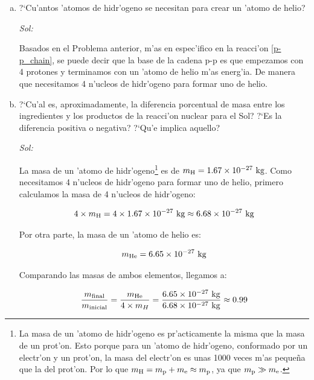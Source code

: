 \documentclass{article}
\begin{document}
\begin{enumerate} [a)]
\item ?`Cu'antos 'atomos de hidr'ogeno se necesitan para crear un 'atomo de helio?

\vspace{2mm}
\emph{Sol:}
\vspace{2mm}

Basados en el Problema anterior, m'as en espec'ifico en la reacci'on \eqref{p-p_chain}, se puede decir que la base de la cadena p-p es que empezamos con 4 protones y terminamos con un 'atomo de helio m'as energ'ia. De manera que necesitamos 4 n'ucleos de hidr'ogeno para formar uno de helio.

\item ?`Cu'al es, aproximadamente, la diferencia porcentual de masa entre los ingredientes y los productos de la reacci'on nuclear para el Sol? ?`Es la diferencia positiva o negativa? ?`Qu'e implica aquello?

\vspace{2mm}
\emph{Sol:}
\vspace{2mm}

La masa de un 'atomo de hidr'ogeno\footnote{La masa de un 'atomo de hidr'ogeno es pr'acticamente la misma que la masa de un prot'on. Esto porque para un 'atomo de hidr'ogeno, conformado por un electr'on y un prot'on, la masa del electr'on es unas 1000 veces m'as pequeña que la del prot'on. Por lo que $m_{\rm H} = m_{\rm p} + m_{\rm e} \approx m_{\rm p}$, ya que $m_{\rm p} \gg m_{\rm e}$.} es de $m_{\rm H} = 1.67 \times 10^{-27} \ \text{kg}$. Como necesitamos 4 n'ucleos de hidr'ogeno para formar uno de helio, primero calculamos la masa de 4 n'ucleos de hidr'ogeno:

\begin{equation}
4 \times m_{\rm H} = 4 \times 1.67 \times 10^{-27} \ \text{kg} \approx 6.68 \times 10^{-27} \ \text{kg}
\end{equation}

Por otra parte, la masa de un 'atomo de helio es:

\begin{equation}
m_{\rm He}  = 6.65 \times 10^{-27} \ \text{kg}
\end{equation}

Comparando las masas de ambos elementos, llegamos a:

\begin{equation}
\frac{m_{\rm final}}{m_{\rm inicial}} = \frac{m_{\rm He}}{4 \times m_{H}} = \frac{6.65 \times 10^{-27} \ \text{kg}}{6.68 \times 10^{-27} \ \text{kg}} \approx 0.99
\end{equation}


\end{enumerate}
\end{document}
